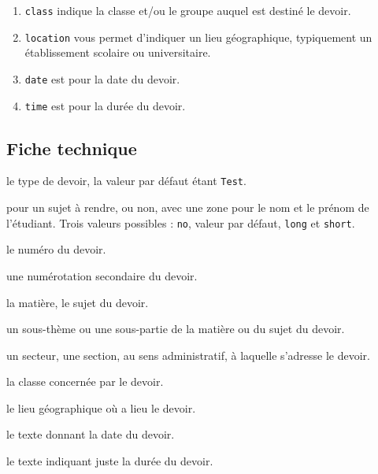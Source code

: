 \documentclass[12pt,a4paper]{scrartcl}
\begin{document}
\begin{enumerate}
	\item \verb+class+ indique la classe et/ou le groupe auquel est destiné le devoir.

	\item \verb+location+ vous permet d'indiquer un lieu géographique, typiquement un établissement scolaire ou universitaire.

	\item \verb+date+ est pour la date du devoir.

	\item \verb+time+ est pour la durée du devoir.
\end{enumerate}


%


	\subsection{Fiche technique}


 le type de devoir, la valeur par défaut étant \verb+Test+.

 pour un sujet à rendre, ou non, avec une zone pour le nom et le prénom de l'étudiant. Trois valeurs possibles : \verb+no+, valeur par défaut, \verb+long+ et \verb+short+.

 le numéro du devoir.

 une numérotation secondaire du devoir.

 la matière, le sujet du devoir.

 un sous-thème ou une sous-partie de la matière ou du sujet du devoir.

 un secteur, une section, au sens administratif, à laquelle s'adresse le devoir.

 la classe concernée par le devoir.

 le lieu géographique où a lieu le devoir.

 le texte donnant la date du devoir.

 le texte indiquant juste la durée du devoir.
\end{document}
